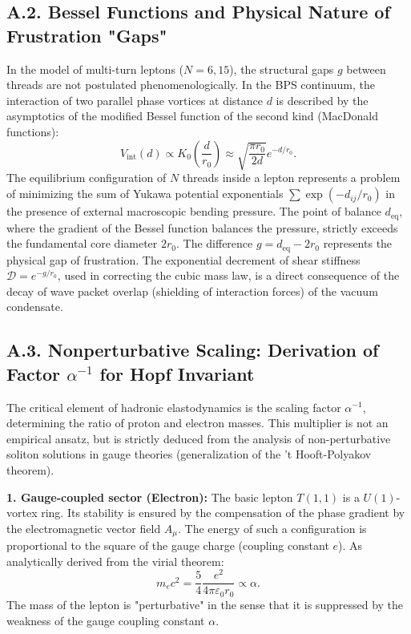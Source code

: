 \documentclass[11pt,a4paper]{article}
\begin{document}
\subsection*{A.2. Bessel Functions and Physical Nature of Frustration "Gaps"}
	In the model of multi-turn leptons ($N=6, 15$), the structural gaps $g$ between threads are not postulated phenomenologically. In the BPS continuum, the interaction of two parallel phase vortices at distance $d$ is described by the asymptotics of the modified Bessel function of the second kind (MacDonald functions):
\begin{equation}
V_{\text{int}}(d) \propto K_0\left(\frac{d}{r_0}\right) \approx \sqrt{\frac{\pi r_0}{2d}} e^{-d/r_0}.
\end{equation}
The equilibrium configuration of $N$ threads inside a lepton represents a problem of minimizing the sum of Yukawa potential exponentials $\sum \exp(-d_{ij}/r_0)$ in the presence of external macroscopic bending pressure. The point of balance $d_{\text{eq}}$, where the gradient of the Bessel function balances the pressure, strictly exceeds the fundamental core diameter $2r_0$. 
The difference $g = d_{\text{eq}} - 2r_0$ represents the physical gap of frustration. The exponential decrement of shear stiffness $\mathcal{D} = e^{-g/r_0}$, used in correcting the cubic mass law, is a direct consequence of the decay of wave packet overlap (shielding of interaction forces) of the vacuum condensate.

\subsection*{A.3. Nonperturbative Scaling: Derivation of Factor $\alpha^{-1}$ for Hopf Invariant}

The critical element of hadronic elastodynamics is the scaling factor $\alpha^{-1}$, determining the ratio of proton and electron masses. This multiplier is not an empirical ansatz, but is strictly deduced from the analysis of non-perturbative soliton solutions in gauge theories (generalization of the 't Hooft-Polyakov theorem).

\textbf{1. Gauge-coupled sector (Electron):}
The basic lepton $T(1,1)$ is a $U(1)$-vortex ring. Its stability is ensured by the compensation of the phase gradient by the electromagnetic vector field $A_\mu$. The energy of such a configuration is proportional to the square of the gauge charge (coupling constant $e$). As analytically derived from the virial theorem:
\begin{equation}
	m_e c^2 = \frac{5}{4} \frac{e^2}{4\pi\varepsilon_0 r_0} \propto \alpha.
	\label{eq:me_scaling}
\end{equation}
The mass of the lepton is "perturbative" in the sense that it is suppressed by the weakness of the gauge coupling constant $\alpha$.
\end{document}

